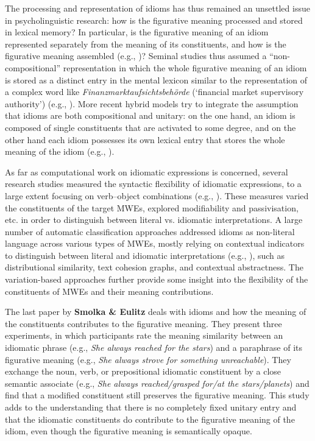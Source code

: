 \documentclass[output=paper]{langsci/langscibook}
\begin{document}
The processing and representation of idioms has thus remained an
unsettled issue in psycholinguistic research: how is the figurative
meaning processed and stored in lexical memory? In particular, is the
figurative meaning of an idiom represented separately from the meaning
of its constituents, and how is the figurative meaning assembled
(e.g., \citealt{Cacciari/Tabossi:88, Gibbs:92, Cacciari/Glucksberg:94,
  Titone/Connine:99, Hamblin/Gibbs:03})? Seminal studies thus assumed
a ``non-compositional'' representation in which the whole figurative
meaning of an idiom is stored as a distinct entry in the mental
lexicon similar to the representation of a complex word like
\textit{Finanzmarktaufsichtsbehörde} (`financial market supervisory
authority') (e.g., \citealt{Bobrow/Bell:73, Swinney/Cutler:79,
  Gibbs:80}). More recent hybrid models try to integrate the
assumption that idioms are both compositional and unitary: on the one
hand, an idiom is composed of single constituents that are
activated to some degree, and on the other hand each idiom possesses
its own lexical entry that stores the whole meaning of the idiom
(e.g., \citealt{Cacciari/Tabossi:88, GibbsEtAl:89, Cutting/Bock:97,
  Titone/Connine:99, SprengerEtAl:06, Caillies/Butcher:07,
  Holsinger/Kaiser:13, Titone/Libben:14}).

As far as computational work on idiomatic expressions is concerned,
several research studies measured the syntactic flexibility of
idiomatic expressions, to a large extent focusing on verb--object
combinations (e.g., \citealt{Bannard:07,FazlyEtAl:09}). These measures
varied the constituents of the target MWEs, explored modifiability and
passivisation, etc. in order to distinguish between literal
vs. idiomatic interpretations. A large number of automatic
classification approaches addressed idioms as non-literal language across various types of MWEs, mostly relying on
contextual indicators to distinguish between literal and idiomatic
interpretations (e.g.,
\citealt{Sporleder/Li:09,TurneyEtAl:11,Koeper/SchulteImWalde:16b}),
such as distributional similarity, text cohesion graphs, and
contextual abstractness. The variation-based approaches further
provide some insight into the flexibility of the constituents of MWEs and
their meaning contributions.

The last paper by \textbf{Smolka \& Eulitz} deals with idioms and how
the meaning of the constituents contributes to the figurative meaning. They
present three experiments, in which participants rate the meaning
similarity between an idiomatic phrase (e.g., \textit{She always
  reached for the stars}) and a paraphrase of its figurative meaning
(e.g., \textit{She always strove for something unreachable}). They
exchange the noun, verb, or prepositional idiomatic constituent by a
close semantic associate (e.g., \textit{She always reached\slash grasped
  for\slash at the stars\slash planets}) and find that a modified constituent
still preserves the figurative meaning. This study adds to the
understanding that there is no completely fixed unitary entry and
that the idiomatic constituents do contribute to the figurative
meaning of the idiom, even though the figurative meaning is
semantically opaque.
\end{document}
